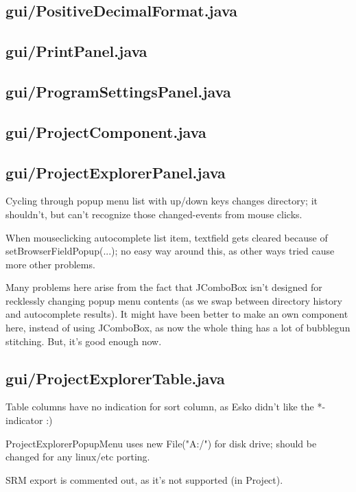 \subsection{gui/PositiveDecimalFormat.java}

\subsection{gui/PrintPanel.java}

\subsection{gui/ProgramSettingsPanel.java}

\subsection{gui/ProjectComponent.java}


\subsection{gui/ProjectExplorerPanel.java}

Cycling through popup menu list with up/down keys changes directory; it shouldn't, but can't recognize those changed-events from mouse clicks.

When mouseclicking autocomplete list item, textfield gets cleared because of setBrowserFieldPopup(...); no easy way around this, as other ways tried cause more other problems.

Many problems here arise from the fact that JComboBox isn't designed for recklessly changing popup menu contents (as we swap between directory history and autocomplete results). It might have been better to make an own component here, instead of using JComboBox, as now the whole thing has a lot of bubblegun stitching. But, it's good enough now.


\subsection{gui/ProjectExplorerTable.java}

Table columns have no indication for sort column, as Esko didn't like the *-indicator :)
	    
ProjectExplorerPopupMenu uses new File("A:/") for disk drive; should be changed for any linux/etc porting.

SRM export is commented out, as it's not supported (in Project).

